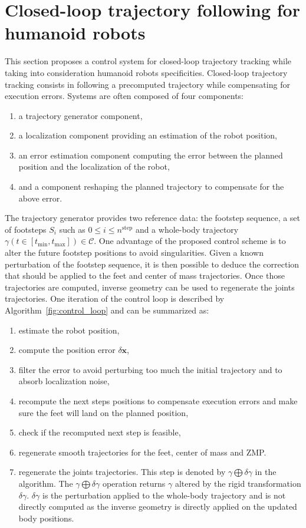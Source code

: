 \section{Closed-loop trajectory following for humanoid robots}
\label{closedloop}
%
%
This section proposes a control system for closed-loop trajectory
tracking while taking into consideration humanoid robots
specificities.
%
%
Closed-loop trajectory tracking consists in following a precomputed
trajectory while compensating for execution errors. Systems are often
composed of four components:
\begin{enumerate}
\item a trajectory generator component,
\item a localization component providing an estimation of the robot
  position,
\item an error estimation component computing the error between the
  planned position and the localization of the robot,
\item and a component reshaping the planned trajectory to compensate
  for the above error.
\end{enumerate}
%
%
The trajectory generator provides two reference data: the footstep
sequence, a set of footsteps $S_i$ such as \mbox{$0 \leq i \leq
  n^{\text{step}}$} and a whole-body trajectory \mbox{$\gamma(t \in
  [t_{\text{min}}, t_{\text{max}}]) \in \mathcal{C}$}. One advantage
of the proposed control scheme is to alter the future footstep
positions to avoid singularities. Given a known perturbation of the
footstep sequence, it is then possible to deduce the correction that
should be applied to the feet and center of mass trajectories. Once
those trajectories are computed, inverse geometry can be used to
regenerate the joints trajectories.
%
%
One iteration of the control loop is described by
Algorithm~\ref{fig:control_loop} and can be summarized as:
\begin{enumerate}
\item estimate the robot position,
\item compute the position error \mbox{$\delta \mathbf{x}$},
\item filter the error to avoid perturbing too much the initial
  trajectory and to absorb localization noise,
\item recompute the next steps positions to compensate execution
  errors and make sure the feet will land on the planned position,
\item check if the recomputed next step is feasible,
\item regenerate smooth trajectories for the feet, center of mass and
  ZMP.
\item regenerate the joints trajectories. This step is denoted by
  \mbox{$\gamma \bigoplus \delta \gamma$} in the algorithm. The
  \mbox{$\gamma \bigoplus \delta \gamma$} operation returns $\gamma$
  altered by the rigid transformation \mbox{$\delta \gamma$}. $\delta
  \gamma$ is the perturbation applied to the whole-body trajectory and
  is not directly computed as the inverse geometry is directly applied
  on the updated body positions.
\end{enumerate}
